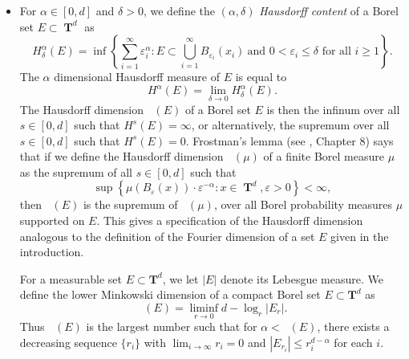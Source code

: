 \documentclass[dvipsnames,letterpaper,12pt]{article}
\numberwithin{equation}{section}
\DeclareMathOperator{\hausdim}{\dim_{\mathbf{H}}}
\DeclareMathOperator{\lowminkdim}{\underline{\dim}_{\mathbf{M}}}
\DeclareMathOperator{\TT}{\mathbf{T}}
\numberwithin{theorem}{section}
\begin{document}
\begin{itemize}
    \item For $\alpha \in [0,d]$ and $\delta > 0$, we define the $(\alpha,\delta)$ \emph{Hausdorff content} of a Borel set $E \subset \TT^d$ as
    \[ H^\alpha_\delta(E) = \inf \left\{ \sum_{i = 1}^\infty \varepsilon_i^\alpha : E \subset \bigcup_{i = 1}^\infty B_{\varepsilon_i}(x_i)\ \text{and $0 < \varepsilon_i \leq \delta$ for all $i \geq 1$} \right\}. \]
    The $\alpha$ dimensional Hausdorff measure of $E$ is equal to
    \[ H^\alpha(E) = \lim_{\delta \to 0} H^\alpha_\delta(E). \]
    The Hausdorff dimension $\hausdim(E)$ of a Borel set $E$ is then the infinum over all $s \in [0,d]$ such that $H^s(E) = \infty$, or alternatively, the supremum over all $s \in [0,d]$ such that $H^s(E) = 0$. Frostman's lemma (see \cite{Mattila}, Chapter 8) says that if we define the Hausdorff dimension $\hausdim(\mu)$ of a finite Borel measure $\mu$ as the supremum of all $s \in [0,d]$ such that
    \[ \sup \left\{ \mu(B_\varepsilon(x)) \cdot \varepsilon^{-\alpha} : x \in \TT^d, \varepsilon > 0 \right\} < \infty, \]
    then $\hausdim(E)$ is the supremum of $\hausdim(\mu)$, over all Borel probability measures $\mu$ supported on $E$. This gives a specification of the Hausdorff dimension analogous to the definition of the Fourier dimension of a set $E$ given in the introduction.


    For a measurable set $E \subset \mathbf{T}^d$, we let $|E|$ denote its Lebesgue measure. We define the lower Minkowski dimension of a compact Borel set $E \subset \mathbf{T}^d$ as
    \[ \lowminkdim(E) = \liminf_{r \to 0} d - \log_r|E_r|. \]
    Thus $\lowminkdim(E)$ is the largest number such that for $\alpha < \lowminkdim(E)$, there exists a decreasing sequence $\{ r_i \}$ with $\lim_{i \to \infty} r_i = 0$ and $|E_{r_i}| \leq r_i^{d - \alpha}$ for each $i$.


\end{itemize}
\end{document}
